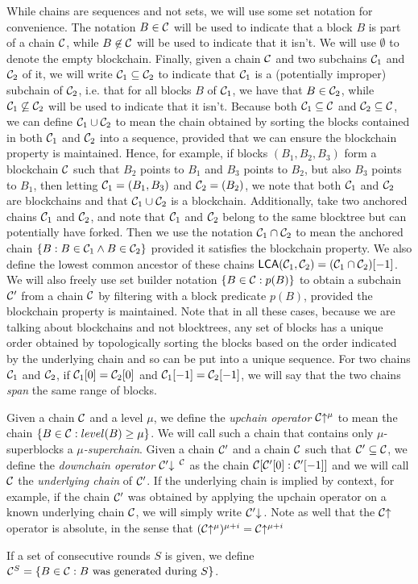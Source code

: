 While chains are sequences and not sets, we will use some set notation for
convenience. The notation $B \in \mathcal{C}$ will be used to indicate that a block
$B$ is part of a chain $\mathcal{C}$, while $B \not\in \mathcal{C}$ will be used to
indicate that it isn't. We will use $\emptyset$ to denote the empty blockchain.
Finally, given a chain $\mathcal{C}$ and two subchains $\mathcal{C}_1$ and $\mathcal{C}_2$ of
it, we will write $\mathcal{C}_1 \subseteq \mathcal{C}_2$ to indicate that $\mathcal{C}_1$ is a
(potentially improper) subchain of $\mathcal{C}_2$, i.e. that for all blocks $B$ of
$\mathcal{C}_1$, we have that $B \in \mathcal{C}_2$, while $\mathcal{C}_1 \not\subseteq
\mathcal{C}_2$ will be used to indicate that it isn't. Because both $\mathcal{C}_1
\subseteq \mathcal{C}$ and $\mathcal{C}_2 \subseteq \mathcal{C}$, we can define $\mathcal{C}_1 \cup
\mathcal{C}_2$ to mean the chain obtained by sorting the blocks contained in both
$\mathcal{C}_1$ and $\mathcal{C}_2$ into a sequence, provided that we can ensure the
blockchain property is maintained. Hence, for example, if blocks $(B_1, B_2,
B_3)$ form a blockchain $\mathcal{C}$ such that $B_2$ points to $B_1$ and $B_3$
points to $B_2$, but also $B_3$ points to $B_1$, then letting $\mathcal{C}_1 = (B_1,
B_3)$ and $\mathcal{C}_2 = (B_2)$, we note that both $\mathcal{C}_1$ and $\mathcal{C}_2$ are
blockchains and that $\mathcal{C}_1 \cup \mathcal{C}_2$ is a blockchain. Additionally,
take two anchored chains $\mathcal{C}_1$ and $\mathcal{C}_2$, and note that $\mathcal{C}_1$ and
$\mathcal{C}_2$ belong to the same blocktree but can potentially have forked. Then we
use the notation $\mathcal{C}_1 \cap \mathcal{C}_2$ to mean the anchored chain $\{B: B \in
\mathcal{C}_1 \land B \in \mathcal{C}_2\}$ provided it satisfies the blockchain property.
We also define the lowest common ancestor of these chains $\textsf{LCA}(\mathcal{C}_1,
\mathcal{C}_2) = (\mathcal{C}_1 \cap \mathcal{C}_2)[-1]$. We will also freely use set builder
notation $\{B \in \mathcal{C}: p(B)\}$ to obtain a subchain $\mathcal{C}'$ from a chain
$\mathcal{C}$ by filtering with a block predicate $p(B)$, provided the blockchain
property is maintained. Note that in all these cases, because we are talking
about blockchains and not blocktrees, any set of blocks has a unique order
obtained by topologically sorting the blocks based on the order indicated by the
underlying chain and so can be put into a unique sequence. For two chains
$\mathcal{C}_1$ and $\mathcal{C}_2$, if $\mathcal{C}_1[0] = \mathcal{C}_2[0]$ and $\mathcal{C}_1[-1] =
\mathcal{C}_2[-1]$, we will say that the two chains \textit{span} the same range of
blocks.

Given a chain $\mathcal{C}$ and a level $\mu$, we define the \textit{upchain
operator} $\mathcal{C}\negthickspace\uparrow^\mu$ to mean the chain $\{B \in \mathcal{C}: level(B) \geq
\mu\}$. We will call such a chain that contains only $\mu$-superblocks a
$\mu$\textit{-superchain}. Given a chain $\mathcal{C}'$ and a chain $\mathcal{C}$ such
that $\mathcal{C}' \subseteq \mathcal{C}$, we define the \textit{downchain operator}
$\mathcal{C}'\negthickspace\downarrow\,^{\mathcal{C}}$ as the chain $\mathcal{C}[\mathcal{C}'[0]:\mathcal{C}'[-1]]$ and we
will call $\mathcal{C}$ the \textit{underlying chain} of $\mathcal{C}'$. If the underlying
chain is implied by context, for example, if the chain $\mathcal{C}'$ was obtained by
applying the upchain operator on a known underlying chain $\mathcal{C}$, we will
simply write $\mathcal{C}'\negthickspace\downarrow\,$. Note as well that the $\mathcal{C}\negthickspace\uparrow$
operator is absolute, in the sense that $(\mathcal{C}\negthickspace\uparrow^\mu)^{\mu + i} =
\mathcal{C}\negthickspace\uparrow^{\mu + i}$

If a set of consecutive rounds $S$ is given, we define $\mathcal{C}^S = \{B \in
\mathcal{C}: B \textnormal{ was generated during } S\}$.

